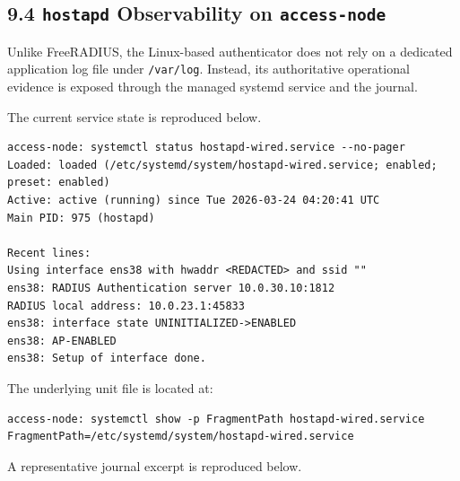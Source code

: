 \documentclass[11pt]{article}
\begin{document}

\subsection{9.4 \texttt{hostapd} Observability on \texttt{access-node}}
\label{sec:hostapd-observability-on-access-node}

Unlike FreeRADIUS, the Linux-based authenticator does not rely on a dedicated application log file under \texttt{/var/log}. Instead, its authoritative operational evidence is exposed through the managed systemd service and the journal.

The current service state is reproduced below.

\begin{verbatim}
access-node: systemctl status hostapd-wired.service --no-pager
Loaded: loaded (/etc/systemd/system/hostapd-wired.service; enabled; preset: enabled)
Active: active (running) since Tue 2026-03-24 04:20:41 UTC
Main PID: 975 (hostapd)

Recent lines:
Using interface ens38 with hwaddr <REDACTED> and ssid ""
ens38: RADIUS Authentication server 10.0.30.10:1812
RADIUS local address: 10.0.23.1:45833
ens38: interface state UNINITIALIZED->ENABLED
ens38: AP-ENABLED
ens38: Setup of interface done.
\end{verbatim}

The underlying unit file is located at:

\begin{verbatim}
access-node: systemctl show -p FragmentPath hostapd-wired.service
FragmentPath=/etc/systemd/system/hostapd-wired.service
\end{verbatim}

A representative journal excerpt is reproduced below.

\end{document}
